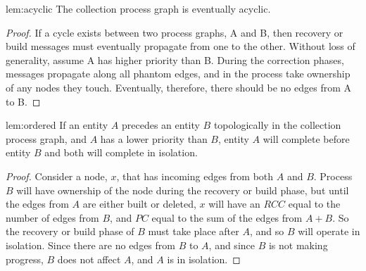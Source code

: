 \begin{replemma}{lem:acyclic}
The collection process graph is eventually acyclic.
\end{replemma}
\begin{proof}
If a cycle exists between two process graphs, A and B, then recovery or
build messages must eventually propagate from one to the other. Without
loss of generality, assume A has higher priority than B. During the
correction phases, messages propagate along all phantom edges, and
in the process take ownership of any nodes they touch. Eventually, therefore,
there should be no edges from A to B.
\end{proof}

\begin{replemma}{lem:ordered}
If an entity $A$ precedes an entity $B$ topologically in the collection process graph, and
$A$ has a lower priority than $B$, entity $A$ will complete before entity $B$ and both will
complete in isolation.
\end{replemma}
\begin{proof}
Consider a node, $x$, that has incoming edges from both $A$ and $B$. Process $B$ will
have ownership of the node during the recovery or build phase, but until the
edges from $A$ are either built or deleted, $x$ will have an $RCC$ equal to the
number of edges from $B$, and $PC$ equal to the sum of the edges from $A + B$.
So the recovery or build phase of $B$ must take place after $A$, and so
$B$ will operate in isolation. Since there are no edges from $B$ to $A$, and since $B$ is not
making progress, $B$ does not affect $A$, and $A$ is in isolation.
\end{proof}

